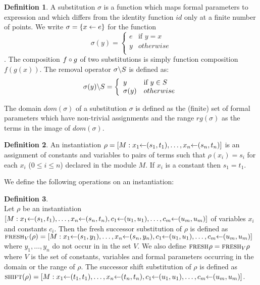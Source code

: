 \documentclass[a4paper]{article}
\theoremstyle{definition}
\newtheorem{definition}{Definition}
\begin{document}
 \begin{definition}
   A substitution $\sigma$ is a function which maps formal parameters
   to expression and which differs from the identity function $id$
   only at a finite number of points. We write
   $\sigma=\{x \leftarrow e\}$ for the function
   \[\sigma(y)=\left\{
       \begin{array}{ll}
         e& \mbox{if }y = x\\
         y & otherwise\\
       \end{array}\right.
   \]. The composition $f \circ g$ of two substitutions is simply
   function composition $f(g(x))$. The removal operator
   $\sigma\backslash S$ is defined as:
   \[\sigma(y)\backslash S = \left\{
       \begin{array}{ll}
         y &\mbox{if }y \in S\\
         \sigma(y) & otherwise\\
       \end{array}\right.
   \]

   The domain $dom(\sigma)$ of a substitution $\sigma$ is defined as
   the (finite) set of formal parameters which have non-trivial
   assignments and the range $rg(\sigma)$ as the terms in the image of
   $dom(\sigma)$.
 \end{definition}

\begin{definition}
  An instantiation $\rho=[M:x_1 {\leftarrow} (s_1,t_1),
  \ldots, x_n {\leftarrow} (s_n,t_n)]$ is an assignment of constants and variables to
  pairs of terms such that $\rho(x_i)=s_i$ for each $x_i$ ($0 \leq i \leq n$)
  declared in the module $M$. If $x_i$ is a constant then $s_1 = t_1$.
\end{definition}

We define the following operations on an instantiation:

\begin{definition}\mbox{ }\\
Let $\rho$ be an instantiation $[M:x_1 {\leftarrow} (s_1,t_1), \ldots,
  x_n {\leftarrow} (s_n,t_n), c_1 {\leftarrow} (u_1,u_1),\ldots,c_m {\leftarrow} (u_m,u_m) ]$ of
 variables $x_i$ and constants $c_i$.
Then the fresh successor substitution of $\rho$ is defined as
 $\mbox{\sc fresh$_{V}$}(\rho) = [M:x_1 {\leftarrow} (s_1,y_1), \ldots,
  x_n {\leftarrow} (s_n,y_n), c_1 {\leftarrow} (u_1,u_1),\ldots,c_m {\leftarrow} (u_m,u_m) ]$
 where $y_1,\ldots,y_n$ do not occur in
 in the set $V$.
 We also define $\mbox{\sc fresh$_{}$}{\rho}=\mbox{\sc fresh$_{V}$}{\rho}$ where $V$ is the set
 of constants, variables and formal parameters occurring in the domain or the
 range of $\rho$.
The successor shift substitution of $\rho$ is defined as  $\mbox{\sc shift}(\rho) =
 [M: x_1 {\leftarrow}  (t_1,t_1), \ldots, x_n {\leftarrow} (t_n,t_n),
   c_1 {\leftarrow} (u_1,u_1), \ldots, c_m {\leftarrow} (u_m,u_m) ]$.
\end{definition}
\end{document}
